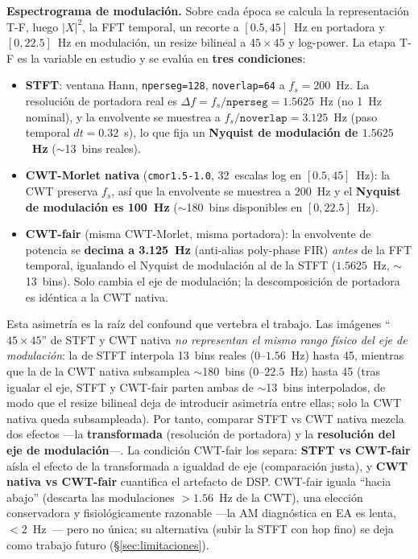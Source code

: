 \documentclass[11pt, a4paper]{article}
\begin{document}
\textbf{Espectrograma de modulación.} Sobre cada época se calcula la
representación T-F, luego $|X|^2$, la FFT temporal, un recorte a
$[0.5,45]$~Hz en portadora y $[0,22.5]$~Hz en modulación, un resize
bilineal a $45\times45$ y log-power. La etapa T-F es la variable en estudio
y se evalúa en \textbf{tres condiciones}:

\begin{itemize}[leftmargin=*, topsep=2pt]
    \item \textbf{STFT}: ventana Hann, \texttt{nperseg=128},
    \texttt{noverlap=64} a $f_s=200$~Hz. La resolución de portadora real es
    $\Delta f = f_s/\texttt{nperseg} = 1.5625$~Hz (no 1~Hz nominal), y la
    envolvente se muestrea a $f_s/\texttt{noverlap} = 3.125$~Hz (paso
    temporal $dt = 0.32$~s), lo que fija un \textbf{Nyquist de modulación de
    $1.5625$~Hz} ($\sim$13~bins reales).
    \item \textbf{CWT-Morlet nativa} (\texttt{cmor1.5-1.0}, 32~escalas log
    en $[0.5,45]$~Hz): la CWT preserva $f_s$, así que la envolvente se
    muestrea a 200~Hz y el \textbf{Nyquist de modulación es 100~Hz}
    ($\sim$180~bins disponibles en $[0,22.5]$~Hz).
    \item \textbf{CWT-fair} (misma CWT-Morlet, misma portadora): la
    envolvente de potencia se \textbf{decima a 3.125~Hz} (anti-alias
    poly-phase FIR) \emph{antes} de la FFT temporal, igualando el Nyquist de
    modulación al de la STFT ($1.5625$~Hz, $\sim$13~bins). Solo cambia el
    eje de modulación; la descomposición de portadora es idéntica a la CWT
    nativa.
\end{itemize}

Esta asimetría es la raíz del confound que vertebra el trabajo. Las
imágenes ``$45\times45$'' de STFT y CWT nativa \emph{no representan el mismo
rango físico del eje de modulación}: la de STFT interpola 13~bins reales
($0$--$1.56$~Hz) hasta 45, mientras que la de la CWT nativa subsamplea
$\sim$180~bins ($0$--$22.5$~Hz) hasta 45 (tras igualar el eje, STFT y
CWT-fair parten ambas de $\sim$13~bins interpolados, de modo que el resize
bilineal deja de introducir asimetría entre ellas; solo la CWT nativa queda
subsampleada). Por tanto, comparar STFT vs CWT nativa mezcla dos efectos ---la \textbf{transformada} (resolución de
portadora) y la \textbf{resolución del eje de modulación}---. La condición
CWT-fair los separa: \textbf{STFT vs CWT-fair} aísla el efecto de la
transformada a igualdad de eje (comparación justa), y \textbf{CWT nativa vs
CWT-fair} cuantifica el artefacto de DSP. CWT-fair iguala ``hacia abajo''
(descarta las modulaciones $>1.56$~Hz de la CWT), una elección conservadora
y fisiológicamente razonable ---la AM diagnóstica en EA es lenta,
$<2$~Hz~\cite{Fraga2013}--- pero no única; su alternativa (subir la STFT con
hop fino) se deja como trabajo futuro (§\ref{sec:limitaciones}).
\end{document}
